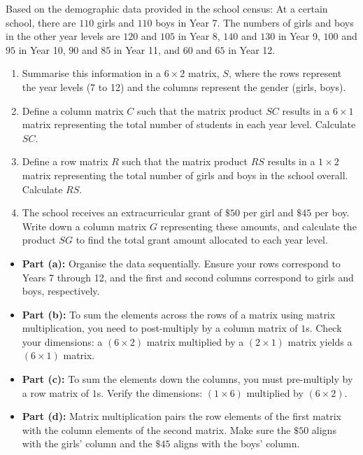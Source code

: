 \begin{problem}
Based on the demographic data provided in the school census:
At a certain school, there are $110$ girls and $110$ boys in Year 7. The numbers of girls and boys in the other year levels are $120$ and $105$ in Year 8, $140$ and $130$ in Year 9, $100$ and $95$ in Year 10, $90$ and $85$ in Year 11, and $60$ and $65$ in Year 12.

\begin{enumerate}[label=\textbf{(\alph*)}]
  \item Summarise this information in a $6 \times 2$ matrix, $S$, where the rows represent the year levels (7 to 12) and the columns represent the gender (girls, boys).
  \item Define a column matrix $C$ such that the matrix product $SC$ results in a $6 \times 1$ matrix representing the total number of students in each year level. Calculate $SC$.
  \item Define a row matrix $R$ such that the matrix product $RS$ results in a $1 \times 2$ matrix representing the total number of girls and boys in the school overall. Calculate $RS$.
  \item The school receives an extracurricular grant of $\$50$ per girl and $\$45$ per boy. Write down a column matrix $G$ representing these amounts, and calculate the product $SG$ to find the total grant amount allocated to each year level.
\end{enumerate}
\end{problem}

\begin{hint}
\begin{itemize}
  \item \textbf{Part (a):} Organise the data sequentially. Ensure your rows correspond to Years 7 through 12, and the first and second columns correspond to girls and boys, respectively.
  \item \textbf{Part (b):} To sum the elements across the rows of a matrix using matrix multiplication, you need to post-multiply by a column matrix of $1$s. Check your dimensions: a $(6 \times 2)$ matrix multiplied by a $(2 \times 1)$ matrix yields a $(6 \times 1)$ matrix.
  \item \textbf{Part (c):} To sum the elements down the columns, you must pre-multiply by a row matrix of $1$s. Verify the dimensions: $(1 \times 6)$ multiplied by $(6 \times 2)$.
  \item \textbf{Part (d):} Matrix multiplication pairs the row elements of the first matrix with the column elements of the second matrix. Make sure the $\$50$ aligns with the girls' column and the $\$45$ aligns with the boys' column.
\end{itemize}
\end{hint}

